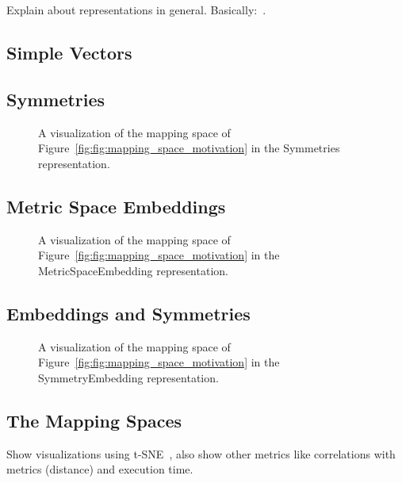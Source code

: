 Explain about representations in general. Basically:~\cite{goens_mcsoc18}.
\subsection{Simple Vectors}

\subsection{Symmetries}

\begin{figure}[h]
	\centering
  \resizebox{0.55\textwidth}{!}{
    \begin{tikzpicture}[x=1pt,y=1pt]
      
    \end{tikzpicture}
    }
	\caption{A visualization of the mapping space of Figure~\ref{fig:fig:mapping_space_motivation} in the Symmetries representation.}
	\label{fig:example_space_symmetries}
\end{figure}
\subsection{Metric Space Embeddings}
\begin{figure}[h]
	\centering
  \resizebox{0.55\textwidth}{!}{
    \begin{tikzpicture}[x=1pt,y=1pt]
      
    \end{tikzpicture}
  }
	\caption{A visualization of the mapping space of Figure~\ref{fig:fig:mapping_space_motivation} in the MetricSpaceEmbedding representation.}
	\label{fig:example_space_embedding}
\end{figure}
\subsection{Embeddings and Symmetries}
\begin{figure}[h]
	\centering
  \resizebox{0.55\textwidth}{!}{
    \begin{tikzpicture}[x=1pt,y=1pt]
    
    \end{tikzpicture}
  }
	\caption{A visualization of the mapping space of Figure~\ref{fig:fig:mapping_space_motivation} in the SymmetryEmbedding representation.}
	\label{fig:example_space_symmetries_embedding}
\end{figure}

\subsection{The Mapping Spaces}
Show visualizations using t-SNE~\cite{tsne}, also show other metrics like
correlations with metrics (distance) and execution time.

